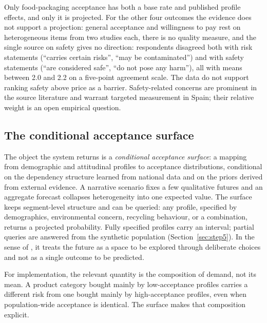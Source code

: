 Only food-packaging acceptance has both a base rate and published profile
effects, and only it is projected. For the other four outcomes the evidence
does not support a projection: general acceptance and willingness to pay rest
on heterogeneous items from two studies each, there is no quality measure,
and the single source on safety gives no direction:
respondents disagreed both with risk statements (``carries certain risks'',
``may be contaminated'') and with safety statements (``are considered safe'',
``do not pose any harm''), all with means between 2.0 and 2.2 on a five-point
agreement scale. The data do not support ranking safety above price as a
barrier. Safety-related concerns are prominent in the
source literature \citep{magnier2019,meng2021} and warrant targeted measurement
in Spain; their relative weight is an open empirical question.

\subsection{The conditional acceptance surface}
\label{sec:surface}

The object the system returns is a \emph{conditional acceptance surface}: a
mapping from demographic and attitudinal profiles to acceptance distributions,
conditional on the dependency structure learned from national data and on the
priors derived from external evidence. A narrative scenario fixes a few
qualitative futures and an aggregate forecast collapses heterogeneity into one
expected value. The surface keeps segment-level structure and can be queried:
any profile, specified by demographics, environmental concern, recycling
behaviour, or a combination, returns a projected probability. Fully specified
profiles carry an interval; partial queries are answered from the synthetic
population (Section~\ref{sec:step5}). In the
sense of \citet{bas2015}, it treats the future as a space to be explored
through deliberate choices and not as a single outcome to be predicted.

For implementation, the relevant quantity is the composition of demand, not
its mean. A product category bought mainly by low-acceptance profiles carries a
different risk from one bought mainly by high-acceptance profiles, even when
population-wide acceptance is identical. The surface makes that composition
explicit.

